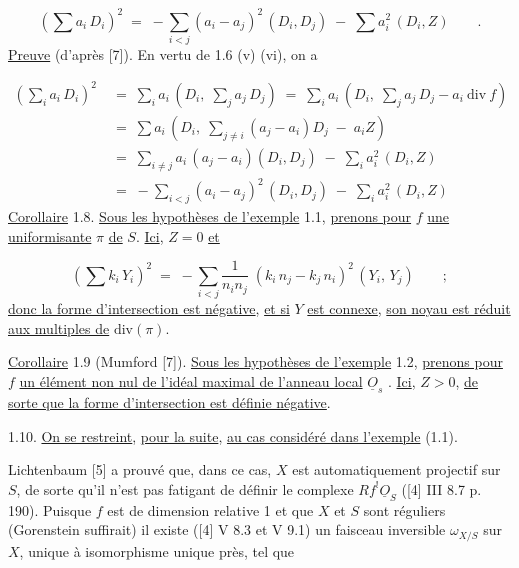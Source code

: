 \begin{equation*}
(\sum a_i\, D_i)^2 \;=\; -\sum_{i<j} (a_i - a_j)^2\, (D_i, D_j) \;-\; \sum a_i^2\, (D_i, Z) \qquad .
\end{equation*}
\underline{Preuve} (d'après [7]). En vertu de 1.6 (v) (vi), on a

\begin{equation*}
\begin{aligned}
(\sum_i a_i\, D_i)^2 \;&=\; \sum_i a_i\, (D_i,\; \sum_j a_j\, D_j) \;=\; \sum_i a_i\, (D_i,\; \sum_j a_j\, D_j - a_i\ \mathrm{div}\ f) \\[2pt]
&=\; \sum a_i\, (D_i,\; \sum_{j \neq i} (a_j - a_i) D_j \;-\; a_i Z) \\[2pt]
&=\; \sum_{i \neq j} a_i\, (a_j - a_i)(D_i, D_j) \;-\; \sum_i a_i^2\, (D_i, Z) \\[2pt]
&=\; -\sum_{i<j} (a_i - a_j)^2\, (D_i, D_j) \;-\; \sum_i a_i^2\, (D_i, Z)
\end{aligned}
\end{equation*}
\underline{Corollaire} 1.8. \underline{Sous les hypothèses de l'exemple} 1.1, \underline{prenons pour} $f$ \underline{une uniformisante} $\pi$ \underline{de} $S$. \underline{Ici}, $Z = 0$ \underline{et}

\begin{equation*}
(\sum k_i\, Y_i)^2 \;=\; -\sum_{i<j} \frac{1}{n_i n_j}\; (k_i\, n_j - k_j\, n_i)^2\, (Y_i,\, Y_j) \qquad ;
\end{equation*}
\underline{donc la forme d'intersection est négative}, \underline{et si} $Y$ \underline{est connexe}, \underline{son noyau est réduit aux multiples de} $\mathrm{div}(\pi)$.

\underline{Corollaire} 1.9 (Mumford [7]). \underline{Sous les hypothèses de l'exemple} 1.2, \underline{prenons pour} $f$ \underline{un élément non nul de l'idéal maximal de l'anneau local} $\underline{O}_s$ . \underline{Ici}, $Z > 0$, \underline{de sorte que la forme d'intersection est définie négative}.



1.10. \underline{On se restreint}, \underline{pour la suite}, \underline{au cas considéré dans l'exemple} (1.1).

Lichtenbaum [5] a prouvé que, dans ce cas, $X$ est automatiquement projectif sur $S$, de sorte qu'il n'est pas fatigant de définir le complexe $Rf^{!}\underline{O}_S$ ([4] III 8.7 p. 190). Puisque $f$ est de dimension relative 1 et que $X$ et $S$ sont réguliers (Gorenstein suffirait) il existe ([4] V 8.3 et V 9.1) un faisceau inversible $\omega_{X/S}$ sur $X$, unique à isomorphisme unique près, tel que

